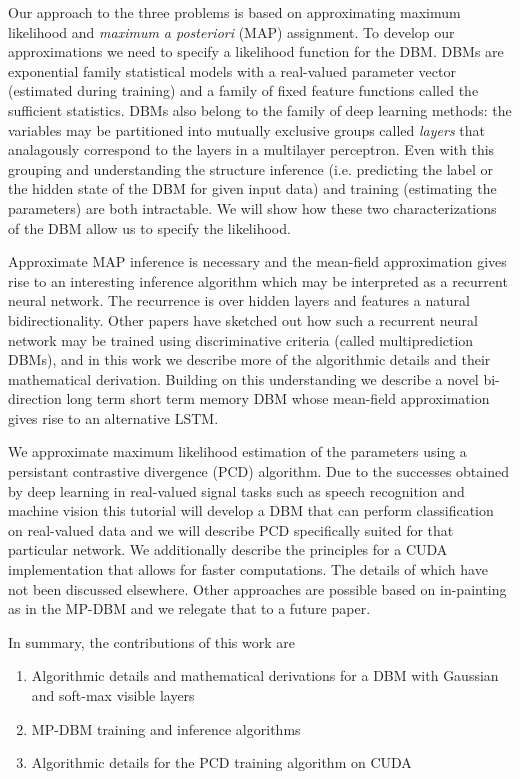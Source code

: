 \documentclass{article} %
\begin{document}
Our approach to the three problems is based on approximating maximum
likelihood and {\it maximum a posteriori} (MAP) assignment.  To
develop our approximations we need to specify a likelihood function
for the DBM.  DBMs are exponential family statistical models with a
real-valued parameter vector (estimated during training) and a family
of fixed feature functions called the sufficient statistics.  DBMs
also belong to the family of deep learning methods: the variables may
be partitioned into mutually exclusive groups called {\it layers} that
analagously correspond to the layers in a multilayer perceptron. Even
with this grouping and understanding the structure inference
(i.e. predicting the label or the hidden state of the DBM for given
input data) and training (estimating the parameters) are both
intractable.  We will show how these two characterizations of the DBM allow us to specify the likelihood.

Approximate MAP inference is necessary and the mean-field approximation gives rise to an interesting inference algorithm
which may be interpreted as a recurrent neural network.  The recurrence is over hidden layers and features a natural
bidirectionality.  Other papers have sketched out how such a recurrent neural network may be trained using discriminative
criteria (called multiprediction DBMs), and in this work we describe more of the algorithmic details and their
mathematical derivation.  Building on this understanding we describe a novel bi-direction long term short term memory
DBM whose mean-field approximation gives rise to an alternative LSTM.

We approximate maximum likelihood estimation of the parameters using a persistant contrastive
divergence (PCD) algorithm. Due to the successes obtained by deep learning in real-valued signal
tasks such as speech recognition and machine vision this tutorial will
develop a DBM that can perform classification on real-valued data and we will describe PCD specifically suited for that
particular network.  We additionally describe the principles for a CUDA implementation
that allows for faster computations.  The details of which have not been discussed elsewhere.  Other approaches are possible based on in-painting
as in the MP-DBM and we relegate that to a future paper.

In summary, the contributions of this work are
\begin{enumerate}
\item Algorithmic details and mathematical derivations for a DBM with Gaussian and soft-max visible layers
\item MP-DBM training and inference algorithms
\item Algorithmic details for the PCD training algorithm on CUDA
\end{enumerate}
\end{document}
